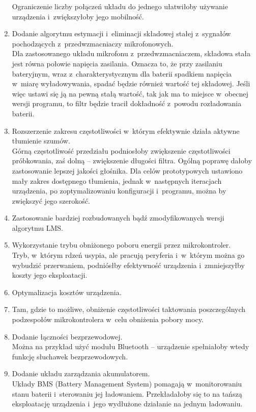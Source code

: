 \begin{enumerate}
\begin{itemize}
	\end{itemize}
	Ograniczenie liczby połączeń układu do jednego ułatwiłoby używanie urządzenia i~zwiększyłoby jego mobilność.
	\item Dodanie algorytmu estymacji i~eliminacji składowej stałej z~sygnałów pochodzących z~przedwzmacniaczy mikrofonowych.\\
	Dla zastosowanego układu mikrofonu z~przedwzmacniaczem, składowa stała jest równa połowie napięcia zasilania. Oznacza to, że przy zasilaniu bateryjnym, wraz z~charakterystycznym dla baterii spadkiem napięcia w~miarę wyładowywania, spadać będzie również wartość tej składowej. Jeśli więc ustawi się ją na pewną stałą wartość, tak jak ma to miejsce w~obecnej wersji programu, to filtr będzie tracił dokładność z~powodu rozładowania baterii.
	\item Rozszerzenie zakresu częstotliwości w~którym efektywnie działa aktywne tłumienie szumów.\\
	Górną częstotliwość przedziału podniosłoby zwiększenie częstotliwości próbkowania, zaś dolną -- zwiększenie długości filtra. Ogólną poprawę dałoby zastosowanie lepszej jakości głośnika. Dla celów prototypowych ustawiono mały zakres dostępnego tłumienia, jednak w~następnych iteracjach urządzenia, po zoptymalizowaniu konfiguracji i~programu, można by zwiększyć jego szerokość.
	\item Zastosowanie bardziej rozbudowanych bądź zmodyfikowanych wersji algorytmu LMS.
	\item Wykorzystanie trybu obniżonego poboru energii przez mikrokontroler.\\
	Tryb, w~którym rdzeń usypia, ale pracują peryferia i~w~którym można go wybudzić przerwaniem, podniósłby efektywność urządzenia i~zmniejszyłby koszty jego eksploatacji.
	\item Optymalizacja kosztów urządzenia.
	\item Tam, gdzie to możliwe, obniżenie częstotliwości taktowania poszczególnych podzespołów mikrokontrolera w~celu obniżenia pobory mocy.
	\item Dodanie łączności bezprzewodowej.\\
	Można  na przykład użyć modułu Bluetooth -- urządzenie spełniałoby wtedy funkcję słuchawek bezprzewodowych.
	\item Dodanie układu zarządzania akumulatorem.\\
	Układy BMS (Battery Management System) pomagają w~monitorowaniu stanu baterii i~sterowaniu jej ładowaniem. Przekładałoby się to na tańszą eksploatację urządzenia i~jego wydłużone działanie na jednym ładowaniu.
\end{enumerate}

